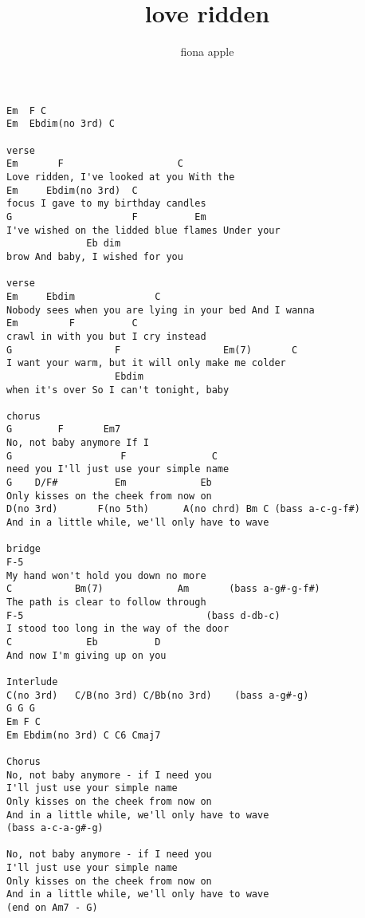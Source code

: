 \author{fiona apple}
\title{love ridden}
\maketitle
\begin{verbatim}
Em  F C
Em  Ebdim(no 3rd) C

verse
Em       F                    C
Love ridden, I've looked at you With the
Em     Ebdim(no 3rd)  C
focus I gave to my birthday candles
G                     F          Em
I've wished on the lidded blue flames Under your
              Eb dim
brow And baby, I wished for you

verse
Em     Ebdim              C
Nobody sees when you are lying in your bed And I wanna
Em         F          C
crawl in with you but I cry instead
G                  F                  Em(7)       C
I want your warm, but it will only make me colder
                   Ebdim
when it's over So I can't tonight, baby

chorus
G        F       Em7
No, not baby anymore If I
G                   F               C
need you I'll just use your simple name
G    D/F#          Em             Eb
Only kisses on the cheek from now on
D(no 3rd)       F(no 5th)      A(no chrd) Bm C (bass a-c-g-f#)
And in a little while, we'll only have to wave

bridge
F-5
My hand won't hold you down no more
C           Bm(7)             Am       (bass a-g#-g-f#)
The path is clear to follow through
F-5                                (bass d-db-c)
I stood too long in the way of the door
C             Eb          D
And now I'm giving up on you

Interlude
C(no 3rd)	C/B(no 3rd)	C/Bb(no 3rd)	(bass a-g#-g)
G G G
Em F C
Em Ebdim(no 3rd) C C6 Cmaj7

Chorus
No, not baby anymore - if I need you
I'll just use your simple name
Only kisses on the cheek from now on
And in a little while, we'll only have to wave
(bass a-c-a-g#-g)

No, not baby anymore - if I need you
I'll just use your simple name
Only kisses on the cheek from now on
And in a little while, we'll only have to wave
(end on Am7 - G)
\end{verbatim}